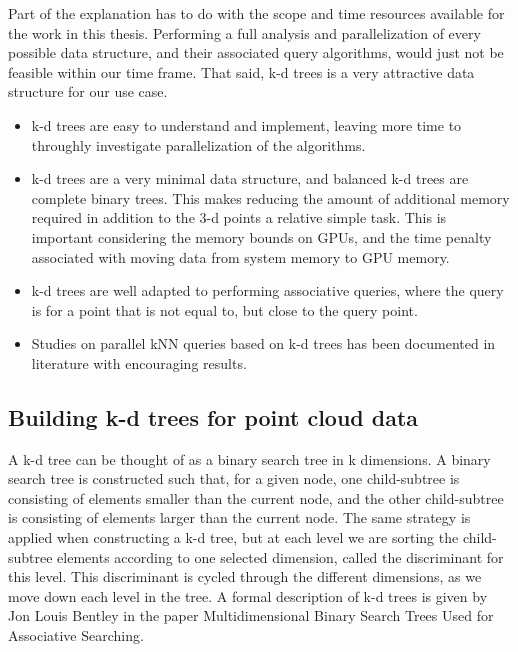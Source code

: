 Part of the explanation has to do with the scope and time resources available for the work in this thesis. Performing a full analysis and parallelization of every possible data structure, and their associated query algorithms, would just not be feasible within our time frame. That said, k-d trees is a very attractive data structure for our use case.

\begin{itemize}
    \item k-d trees are easy to understand and implement, leaving more time to throughly investigate parallelization of the algorithms.
    \item k-d trees are a very minimal data structure, and balanced k-d trees are complete binary trees. This makes reducing the amount of additional memory required in addition to the 3-d points a relative simple task. This is important considering the memory bounds on GPUs, and the time penalty associated with moving data from system memory to GPU memory.
    \item k-d trees are well adapted to performing associative queries, where the query is for a point that is not equal to, but close to the query point.
    \item Studies on parallel kNN queries based on k-d trees has been documented in literature with encouraging results\cite{Owens:2007:ASO,Zhou:2008:RKC:1409060.1409079, Brown2010}.
\end{itemize}

\subsection{Building k-d trees for point cloud data} %
\label{ssub:building_k_d_trees_for_point_cloud_data}

A k-d tree can be thought of as a binary search tree in k dimensions. A binary search tree is constructed such that, for a given node, one child-subtree is consisting of elements smaller than the current node, and the other child-subtree is consisting of elements larger than the current node. The same strategy is applied when constructing a k-d tree, but at each level we are sorting the child-subtree elements according to one selected dimension, called the discriminant for this level. This discriminant is cycled through the different dimensions, as we move down each level in the tree. A formal description of k-d trees is given by Jon Louis Bentley in the paper Multidimensional Binary Search Trees Used for Associative Searching\cite{Bentley:1975:MBS:361002.361007}.

